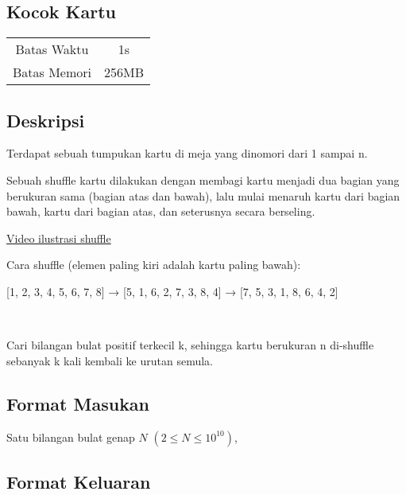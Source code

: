 \documentclass{article}
\begin{document}
\begin{center}

    
    \section*{Kocok Kartu} %

    \begin{tabular}{ | c c | }
        \hline
        Batas Waktu  & 1s \\    %
        Batas Memori & 256MB \\  %
        \hline
    \end{tabular}
\end{center}

\subsection*{Deskripsi}

Terdapat sebuah tumpukan kartu di meja yang dinomori dari 1 sampai n.



Sebuah shuffle kartu dilakukan dengan membagi kartu menjadi dua bagian yang berukuran sama (bagian atas dan bawah), lalu mulai menaruh kartu dari bagian bawah, kartu dari bagian atas, dan seterusnya secara berseling.



\href{https://en.wikipedia.org/wiki/Shuffling#/media/File:Riffle_shuffle.gif}{Video ilustrasi shuffle}


Cara shuffle (elemen paling kiri adalah kartu paling bawah):

[1, 2, 3, 4, 5, 6, 7, 8] → [5, 1, 6, 2, 7, 3, 8, 4] → [7, 5, 3, 1, 8, 6, 4, 2]

\

Cari bilangan bulat positif terkecil k, sehingga kartu berukuran n di-shuffle sebanyak k kali kembali ke urutan semula.

\subsection*{Format Masukan}

Satu bilangan bulat genap $N$ $(2 \leq N \leq 10^{10})$,

\subsection*{Format Keluaran}
\end{document}

